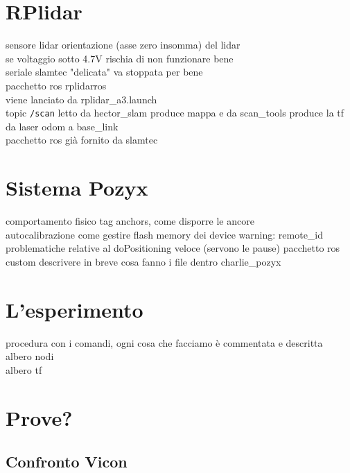 \section{RPlidar}
sensore lidar 
orientazione (asse zero insomma) del lidar \\
se voltaggio sotto 4.7V rischia di non funzionare bene\\
seriale slamtec "delicata" va stoppata per bene\\
pacchetto ros rplidarros\\
viene lanciato da rplidar\_a3.launch \\
topic \texttt{/scan} letto da hector\_slam produce mappa e da scan\_tools produce la tf da laser odom a base\_link \\

pacchetto ros gi\`a fornito da slamtec

\section{Sistema Pozyx}
comportamento fisico
tag
anchors, come disporre le ancore \\
autocalibrazione
come gestire flash memory dei device
warning: remote\_id 
problematiche relative al doPositioning veloce (servono le pause)
pacchetto ros custom descrivere in breve cosa fanno i file dentro charlie\_pozyx


\section{L'esperimento}
procedura con i comandi, ogni cosa che facciamo \`e commentata e descritta \\
albero nodi\\
albero tf\\

\section{Prove?}
\subsection{Confronto Vicon}

